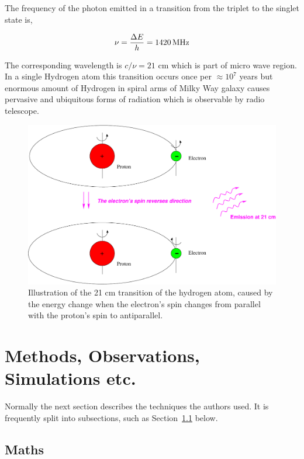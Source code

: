 \documentclass[fleqn,usenatbib]{mnras}
\begin{document}
The frequency of the photon emitted in a transition from the triplet to the singlet state is,

\begin{equation}
 \mathit{\nu}=\frac{\Delta\-E}{h}=\SI{1420}{MHz}
\end{equation}

The corresponding wavelength is $c/\nu=21$ cm which is part of micro wave region. In a single Hydrogen atom this transition occurs once per $\approx10^{7}$ years but enormous amount of Hydrogen in spiral arms of Milky Way galaxy causes pervasive and ubiquitous forms of radiation which is observable by radio telescope.

\begin{figure}
 \includegraphics[width=\columnwidth]{hyperfine}
 \caption{Illustration of the 21 cm transition of the hydrogen atom, caused by the energy change
when the electron's spin changes from parallel with the proton's spin to antiparallel.}
 \label{fig:hyperfine_figure}
\end{figure}

\section{Methods, Observations, Simulations etc.}

Normally the next section describes the techniques the authors used.
It is frequently split into subsections, such as Section~\ref{sec:maths} below.

\subsection{Maths}
\label{sec:maths} %
\end{document}
